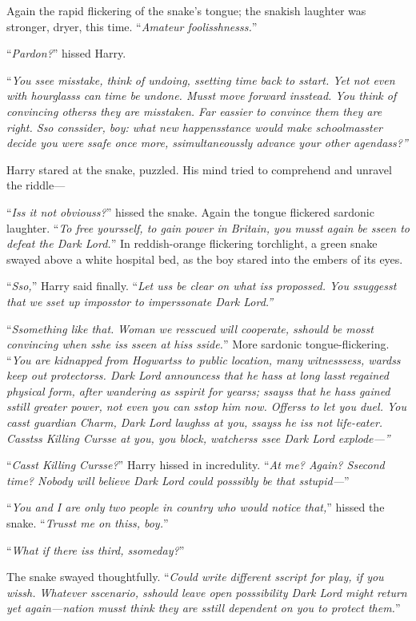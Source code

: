 Again the rapid flickering of the snake’s tongue; the snakish laughter was stronger, dryer, this time. “\emph{Amateur foolisshnesss.}”

“\emph{Pardon?}” hissed Harry.

“\emph{You ssee misstake, think of undoing, ssetting time back to sstart. Yet not even with hourglasss can time be undone. Musst move forward insstead. You think of convincing otherss they are misstaken. Far eassier to convince them they are right. Sso conssider, boy: what new happensstance would make schoolmasster decide you were ssafe once more, ssimultaneoussly advance your other agendass?”}

Harry stared at the snake, puzzled. His mind tried to comprehend and unravel the riddle—

“\emph{Iss it not obviouss?}” hissed the snake. Again the tongue flickered sardonic laughter. “\emph{To free yoursself, to gain power in Britain, you musst again be sseen to defeat the Dark Lord.}”
\sbreak
In reddish-orange flickering torchlight, a green snake swayed above a white hospital bed, as the boy stared into the embers of its eyes.

“\emph{Sso,}” Harry said finally. “\emph{Let uss be clear on what iss propossed. You ssuggesst that we sset up imposstor to imperssonate Dark Lord.”}

“\emph{Ssomething like that.} \emph{Woman we resscued will cooperate, sshould be mosst convincing when sshe iss sseen at hiss sside.}” More sardonic tongue-flickering. “\emph{You are kidnapped from Hogwartss to public location, many witnesssess, wardss keep out protectorss. Dark Lord announcess that he hass at long lasst regained physical form, after wandering as sspirit for yearss; ssayss that he hass gained sstill greater power, not even you can sstop him now. Offerss to let you duel. You casst guardian Charm, Dark Lord laughss at you, ssayss he iss not life-eater. Casstss Killing Cursse at you, you block, watcherss ssee Dark Lord explode—”}

“\emph{Casst Killing Cursse?}” Harry hissed in incredulity. “\emph{At me? Again? Ssecond time? Nobody will believe Dark Lord could posssibly be that sstupid—}”

“\emph{You and I are only two people in country who would notice that,}” hissed the snake. “\emph{Trusst me on thiss, boy.}”

“\emph{What if there iss third, ssomeday?}”

The snake swayed thoughtfully. “\emph{Could write different sscript for play, if you wissh. Whatever sscenario, sshould leave open posssibility Dark Lord might return yet again—nation musst think they are sstill dependent on you to protect them.}”

